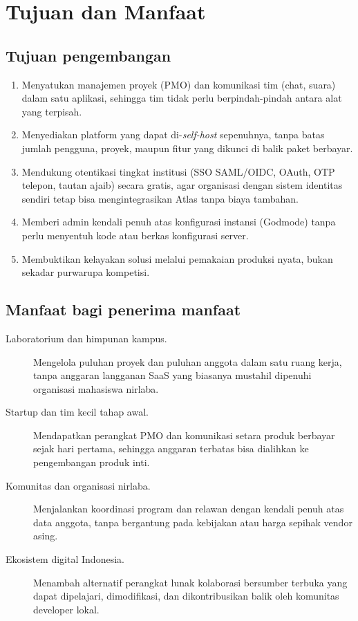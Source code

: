 \section{Tujuan dan Manfaat}

\subsection{Tujuan pengembangan}

\begin{enumerate}
  \item Menyatukan manajemen proyek (PMO) dan komunikasi tim (chat, suara) dalam satu aplikasi, sehingga tim tidak perlu berpindah-pindah antara alat yang terpisah.
  \item Menyediakan platform yang dapat di-\textit{self-host} sepenuhnya, tanpa batas jumlah pengguna, proyek, maupun fitur yang dikunci di balik paket berbayar.
  \item Mendukung otentikasi tingkat institusi (SSO SAML/OIDC, OAuth, OTP telepon, tautan ajaib) secara gratis, agar organisasi dengan sistem identitas sendiri tetap bisa mengintegrasikan Atlas tanpa biaya tambahan.
  \item Memberi admin kendali penuh atas konfigurasi instansi (Godmode) tanpa perlu menyentuh kode atau berkas konfigurasi server.
  \item Membuktikan kelayakan solusi melalui pemakaian produksi nyata, bukan sekadar purwarupa kompetisi.
\end{enumerate}

\subsection{Manfaat bagi penerima manfaat}

\begin{description}
\item[Laboratorium dan himpunan kampus.] Mengelola puluhan proyek dan puluhan anggota dalam satu ruang kerja, tanpa anggaran langganan SaaS yang biasanya mustahil dipenuhi organisasi mahasiswa nirlaba.
\item[Startup dan tim kecil tahap awal.] Mendapatkan perangkat PMO dan komunikasi setara produk berbayar sejak hari pertama, sehingga anggaran terbatas bisa dialihkan ke pengembangan produk inti.
\item[Komunitas dan organisasi nirlaba.] Menjalankan koordinasi program dan relawan dengan kendali penuh atas data anggota, tanpa bergantung pada kebijakan atau harga sepihak vendor asing.
\item[Ekosistem digital Indonesia.] Menambah alternatif perangkat lunak kolaborasi bersumber terbuka yang dapat dipelajari, dimodifikasi, dan dikontribusikan balik oleh komunitas developer lokal.
\end{description}

